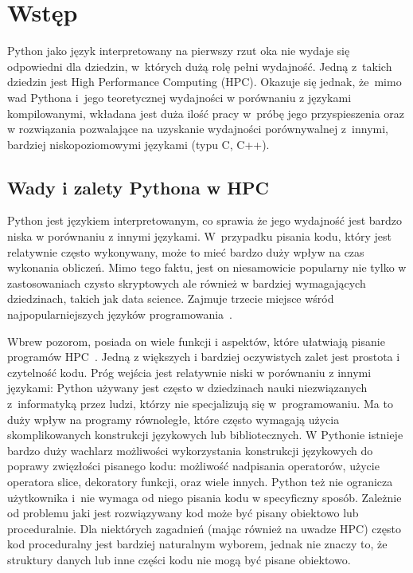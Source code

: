 \section{Wstęp}

Python jako język interpretowany na pierwszy rzut oka nie
wydaje się odpowiedni dla dziedzin, w~których dużą rolę
pełni wydajność.
Jedną z~takich dziedzin jest High Performance Computing (HPC).
Okazuje się jednak, że~mimo wad Pythona i~jego teoretycznej wydajności
w porównaniu z językami kompilowanymi,
wkładana jest duża ilość pracy w~próbę jego przyspieszenia
oraz w rozwiązania pozwalające na uzyskanie wydajności porównywalnej
z~innymi, bardziej niskopoziomowymi językami (typu C, C++).

\subsection{Wady i zalety Pythona w HPC}

Python jest językiem interpretowanym, co sprawia że
jego wydajność jest bardzo niska w porównaniu z innymi językami.
W~przypadku pisania kodu, który jest relatywnie często wykonywany,
może to mieć bardzo duży wpływ na czas wykonania obliczeń.
Mimo tego faktu, jest on niesamowicie popularny
nie tylko w zastosowaniach czysto skryptowych ale również w bardziej
wymagających dziedzinach, takich jak data science.
Zajmuje trzecie miejsce wśród najpopularniejszych
języków programowania~\cite{tiobe}.

Wbrew pozorom, posiada on wiele funkcji i aspektów,
które ułatwiają pisanie programów HPC~\cite{nih_python_in_hpc}.
Jedną z większych i bardziej oczywistych zalet jest
prostota i czytelność kodu.
Próg wejścia jest relatywnie niski w porównaniu z innymi
językami:
Python używany jest często w dziedzinach nauki niezwiązanych
z~informatyką przez ludzi, którzy nie specjalizują się
w~programowaniu.
Ma to duży wpływ na programy równoległe, które często
wymagają użycia skomplikowanych konstrukcji językowych
lub bibliotecznych.
W Pythonie istnieje bardzo duży wachlarz możliwości wykorzystania
konstrukcji językowych do poprawy zwięzłości pisanego kodu:
możliwość nadpisania operatorów, użycie operatora slice,
dekoratory funkcji, oraz wiele innych.
Python też nie ogranicza użytkownika i~nie wymaga od niego
pisania kodu w specyficzny sposób.
Zależnie od problemu jaki jest rozwiązywany kod może
być pisany obiektowo lub proceduralnie.
Dla niektórych zagadnień (mając również na uwadze HPC) często kod proceduralny
jest bardziej naturalnym wyborem, jednak nie znaczy to, że
struktury danych lub inne części kodu nie mogą być pisane obiektowo.

